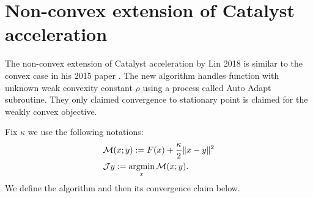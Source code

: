 \documentclass[12pt]{article}
\begin{document}
\section{Non-convex extension of Catalyst acceleration}
    The non-convex extension of Catalyst acceleration by Lin 2018 \cite{lin_catalyst_2018} is similar to the convex case in his 2015 paper \cite{lin_universal_2015}. 
    The new algorithm handles function with unknown weak convexity constant $\rho$ using a process called Auto Adapt subroutine. 
    They only claimed convergence to stationary point is claimed for the weakly convex objective. 
    \par 
    Fix $\kappa$ we use the following notations: 
    \begin{align*}
       & \mathcal M (x; y) := F(x) + \frac{\kappa}{2}\Vert x - y\Vert^2 
       \\
       & \mathcal J y := \mathop{\rm argmin}\limits_x \mathcal M (x; y). 
    \end{align*}
    We define the algorithm and then its convergence claim below. 
\end{document}
